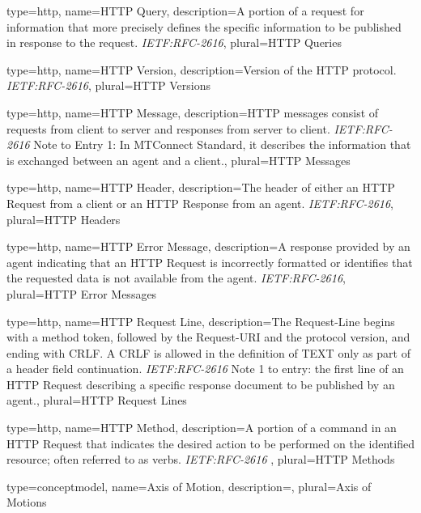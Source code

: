 {
	type={http},
    name={HTTP Query},
	description={A portion of a request for information that more precisely defines the specific information to be published in response to the request. \textit{IETF:RFC-2616}},
	plural={HTTP Queries}
}

{
	type={http},
    name={HTTP Version},
	description={Version of the HTTP protocol. \textit{IETF:RFC-2616}},
	plural={HTTP Versions}
}

{
	type={http},
    name={HTTP Message},
	description={HTTP messages consist of requests from client to server and responses from server to client. \textit{IETF:RFC-2616}
Note to Entry 1: In MTConnect Standard, it describes the information that is exchanged between an \gls{agent} and a \gls{client}.},
	plural={HTTP Messages}
}

{
	type={http},
    name={HTTP Header},
	description={The header of either an \gls{HTTP Request} from a \gls{client} or an \gls{HTTP Response} from an \gls{agent}. \textit{IETF:RFC-2616}},
	plural={HTTP Headers}
}

{
	type={http},
    name={HTTP Error Message},
	description={A response provided by an \gls{agent} indicating that an \gls{HTTP Request} is incorrectly formatted or identifies that the requested data is not available from the \gls{agent}.  \textit{IETF:RFC-2616}},
	plural={HTTP Error Messages}
}

{
	type={http},
    name={HTTP Request Line},
	description={The Request-Line begins with a method token, followed by the Request-URI and the protocol version, and ending with CRLF. A CRLF is allowed in the definition of TEXT only as part of a header field continuation. \textit{IETF:RFC-2616}
Note 1 to entry: the first line of an \gls{HTTP Request} describing a specific \gls{response document} to be published by an \gls{agent}.},
	plural={HTTP Request Lines}
}

{
	type={http},
    name={HTTP Method},
	description={A portion of a command in an \gls{HTTP Request} that indicates the desired action to be performed on the identified resource; often referred to as verbs. \textit{IETF:RFC-2616}
},
	plural={HTTP Methods}
}

{
	type={conceptmodel},
    name={Axis of Motion},
	description={},
	plural={Axis of Motions}
}

